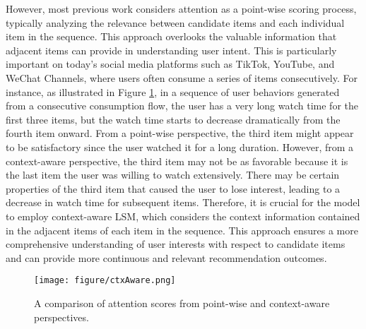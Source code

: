However, most previous work considers attention as a point-wise scoring process, typically analyzing the relevance between candidate items and each individual item in the sequence. This approach overlooks the valuable information that adjacent items can provide in understanding user intent. This is particularly important on today's social media platforms such as TikTok, YouTube, and WeChat Channels, where users often consume a series of items consecutively. For instance, as illustrated in Figure \ref{fig:contextAware}, in a sequence of user behaviors generated from a consecutive consumption flow, the user has a very long watch time for the first three items, but the watch time starts to decrease dramatically from the fourth item onward. From a point-wise perspective, the third item might appear to be satisfactory since the user watched it for a long duration. However, from a context-aware perspective, the third item may not be as favorable because it is the last item the user was willing to watch extensively. There may be certain properties of the third item that caused the user to lose interest, leading to a decrease in watch time for subsequent items. Therefore, it is crucial for the model to employ context-aware LSM, which considers the context information contained in the adjacent items of each item in the sequence. This approach ensures a more comprehensive understanding of user interests with respect to candidate items and can provide more continuous and relevant recommendation outcomes.

\begin{figure}
    \centering
    \texttt{[image: figure/ctxAware.png]}
    \caption{A comparison of attention scores from point-wise and context-aware perspectives. }
    \label{fig:contextAware}
    \vspace{-0.5cm}
\end{figure}

